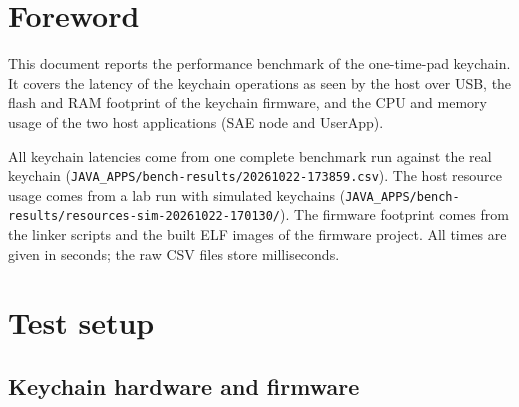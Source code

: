 \documentclass[11pt,a4paper]{report}
\begin{document}
\sloppy

\chapter*{Foreword}

This document reports the performance benchmark of the one-time-pad keychain. It covers the latency of the keychain operations as seen by the host over USB, the flash and RAM footprint of the keychain firmware, and the CPU and memory usage of the two host applications (SAE node and UserApp).

All keychain latencies come from one complete benchmark run against the real keychain (\texttt{JAVA\_APPS/bench-results/20261022-173859.csv}). The host resource usage comes from a lab run with simulated keychains (\texttt{JAVA\_APPS/bench-results/resources-sim-20261022-170130/}). The firmware footprint comes from the linker scripts and the built ELF images of the firmware project. All times are given in seconds; the raw CSV files store milliseconds.

\chapter{Test setup}

\section{Keychain hardware and firmware}
\end{document}
